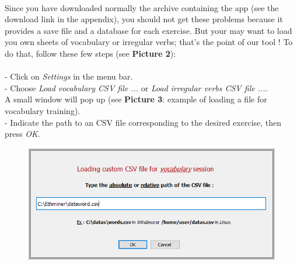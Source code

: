 \documentclass[12pt, a4paper]{report}
\begin{document}
\paragraph{}Since you have downloaded normally the archive containing the app (see the download link in the appendix), you should not get these problems because it provides a save file and a database for each exercise. But your may want to load you own sheets of vocabulary or irregular verbs; that's the point of our tool ! To do that, follow these few steps (see \textbf{Picture 2}):\\
\\
\hspace*{0.5cm}- Click on \textit{Settings} in the menu bar.\\
\hspace*{0.5cm}- Choose \textit{Load vocabulary CSV file ...} or \textit{Load irregular verbs CSV file ...}.\\ A small window will pop up (see \textbf{Picture 3}: example of loading a file for vocabulary training).\\
\hspace*{0.5cm}- Indicate the path to an CSV file corresponding to the desired exercise, then press \textit{OK}.\\

\begin{figure}[H]
    \centering
    \includegraphics[scale=0.55]{images/load.png}
\end{figure}
\end{document}
